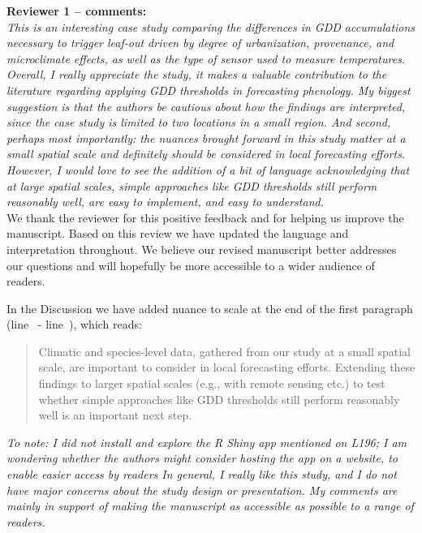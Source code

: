 \documentclass[11pt,a4paper]{article}\usepackage[]{graphicx}\usepackage[]{color}
\newcommand{\lr}[1]{line~\lineref{#1}}
\begin{document}
\textbf {Reviewer 1 -- comments:} \\

\textit{This is an interesting case study comparing the differences in GDD accumulations necessary to trigger leaf-out driven by degree of urbanization, provenance, and microclimate effects, as well as the type of sensor used to measure temperatures. Overall, I really appreciate the study, it makes a valuable contribution to the literature regarding applying GDD thresholds in forecasting phenology. My biggest suggestion is that the authors be cautious about how the findings are interpreted, since the case study is limited to two locations in a small region. And second, perhaps most importantly: the nuances brought forward in this study matter at a small spatial scale and definitely should be considered in local forecasting efforts. However, I would love to see the addition of a bit of language acknowledging that at large spatial scales, simple approaches like GDD thresholds still perform reasonably well, are easy to implement, and easy to understand.}\\

We thank the reviewer for this positive feedback and for helping us improve the manuscript. Based on this review we have updated the language and interpretation throughout. We believe our revised manuscript better addresses our questions and will hopefully be more accessible to a wider audience of readers. 

In the Discussion we have added nuance to scale at the end of the first paragraph (\lr{Z1largespatialscale} - \lr{Z1scaleend}), which reads:\\

\begin{quotation}
\noindent Climatic and species-level data, gathered from our study at a small spatial scale, are important to consider in local forecasting efforts. Extending these findings to larger spatial scales (e.g., with remote sensing etc.) to test whether simple approaches like GDD thresholds still perform reasonably well is an important next step.
\end{quotation}

\textit{To note: I did not install and explore the R Shiny app mentioned on L196; I am wondering whether the authors might consider hosting the app on a website, to enable easier access by readers
In general, I really like this study, and I do not have major concerns about the study design or presentation. My comments are mainly in support of making the manuscript as accessible as possible to a range of readers.} \\
\end{document}
